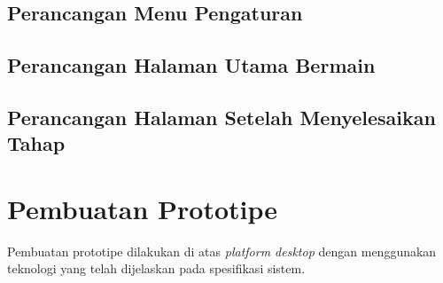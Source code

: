 	\subsection{Perancangan Menu Pengaturan}
	
	\subsection{Perancangan Halaman Utama Bermain}
	
	\subsection{Perancangan Halaman Setelah Menyelesaikan Tahap}
	

\section{Pembuatan Prototipe}

Pembuatan prototipe dilakukan di atas \textit{platform desktop} dengan menggunakan teknologi yang telah dijelaskan pada spesifikasi sistem. 

